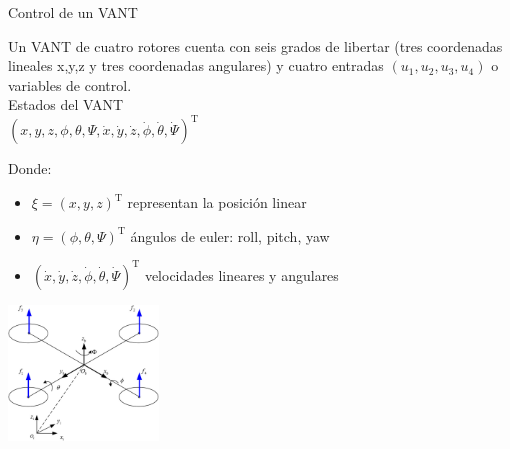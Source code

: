 \documentclass[
  24pt, %
  aspectratio=169, %
]{beamer}
\begin{document}
\begin{frame}{Control de un VANT}
  
  \begin{minipage}{0.47\textwidth}
    
    \small Un VANT de cuatro rotores cuenta con seis grados de libertar (tres coordenadas lineales x,y,z y tres coordenadas angulares) y cuatro entradas $(u_1,u_2,u_3,u_4)$ o variables de control.\\
    
    Estados del VANT \\
    $(x,y,z,\phi,\theta,\Psi,\dot{x},\dot{y},\dot{z},\dot{\phi},\dot{\theta},\dot{\Psi})^\mathrm{T}$

    \bigskip %
    
    Donde:
    \begin{itemize}
    \item $\xi = (x,y,z)^\mathrm{T}$ representan la posición linear
    \item $\eta = (\phi,\theta,\Psi)^\mathrm{T}$ ángulos de euler: roll, pitch, yaw
    \item $(\dot{x},\dot{y},\dot{z},\dot{\phi},\dot{\theta},\dot{\Psi})^\mathrm{T}$ velocidades lineares y angulares
    \end{itemize}
  \end{minipage}
  \hspace{0.2cm}
  \begin{minipage}{0.5\textwidth}
    \centering
    \includegraphics[width=4cm]{uav_model.jpeg}
    \bigskip %
  \end{minipage}
\end{frame}
\end{document}
